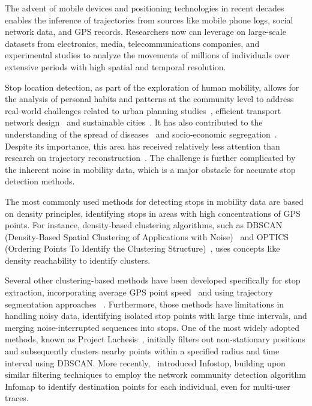 \documentclass{article}
\begin{document}
The advent of mobile devices and positioning technologies in recent decades enables the inference of trajectories from sources like mobile phone logs, social network data, and GPS records. Researchers now can leverage on large-scale datasets from electronics, media, telecommunications companies, and experimental studies to analyze the movements of millions of individuals over extensive periods with high spatial and temporal resolution.

Stop location detection, as part of the exploration of human mobility, allows for the analysis of personal habits and patterns at the community level to address real-world challenges related to urban planning studies~\citep{DeNadai2016}, efficient transport network design~\citep{Ferretti2018} and sustainable cities~\citep{Caitlin2015}. It has also contributed to the understanding of the spread of diseases~\citep{Moritz2020, Oliver2020, Aguilar-Sanchez2022, klein2023forecasting} and socio-economic segregation~\citep{Pappalardo2015, Centellegher2024}. 
Despite its importance, this area has received relatively less attention than research on trajectory reconstruction~\citep{Ramaswamy2004, Aslak2020}. The challenge is further complicated by the inherent noise in mobility data, which is a major obstacle for accurate stop detection methods.

The most commonly used methods for detecting stops in mobility data are based on density principles, identifying stops in areas with high concentrations of GPS points. For instance, density-based clustering algorithms, such as DBSCAN (Density-Based Spatial Clustering of Applications with Noise)~\citep{ester1996density} and OPTICS (Ordering Points To Identify the Clustering Structure)~\citep{ankerst1999optics}, uses concepts like density reachability to identify clusters.

Several other clustering-based methods have been developed specifically for stop extraction, incorporating average GPS point speed~\citep{palma2008clustering} and using trajectory segmentation approaches~\citep{buchin2011segmenting, soares2015grasp} .
Furthermore, those methods have limitations in handling noisy data, identifying isolated stop points with large time intervals, and merging noise-interrupted sequences into stops. 
One of the most widely adopted methods, known as Project Lachesis~\citep{Ramaswamy2004}, initially filters out non-stationary positions and subsequently clusters nearby points within a specified radius and time interval using DBSCAN.
More recently,~\citep{Aslak2020} introduced Infostop, building upon similar filtering techniques to employ the network community detection algorithm Infomap to identify destination points for each individual, even for multi-user traces.
\end{document}
